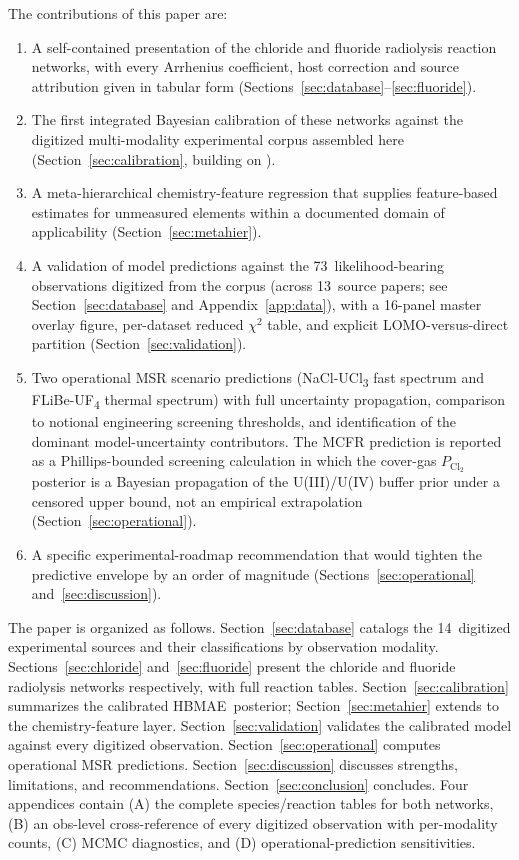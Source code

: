 \documentclass[11pt]{article}
\theoremstyle{plain}
\theoremstyle{definition}
\theoremstyle{remark}
\newcommand{\HBMAE}{HBMAE\xspace}
\begin{document}
The contributions of this paper are:

\begin{enumerate}
\item A self-contained presentation of the chloride and fluoride radiolysis
      reaction networks, with every Arrhenius coefficient, host correction
      and source attribution given in tabular form
      (Sections~\ref{sec:database}--\ref{sec:fluoride}).
\item The first integrated Bayesian calibration of these networks against
      the digitized multi-modality experimental corpus assembled here
      (Section~\ref{sec:calibration}, building on \citealp{Tanore2026PaperI}).
\item A meta-hierarchical chemistry-feature regression that supplies
      feature-based estimates for unmeasured elements within a documented
      domain of applicability (Section~\ref{sec:metahier}).
\item A validation of model predictions against the 73~likelihood-bearing
      observations digitized from the corpus (across 13~source papers; see
      Section~\ref{sec:database} and Appendix~\ref{app:data}), with a
      16-panel master overlay figure, per-dataset reduced $\chi^2$ table,
      and explicit LOMO-versus-direct partition (Section~\ref{sec:validation}).
\item Two operational MSR scenario predictions
      (NaCl-UCl\textsubscript{3} fast spectrum and FLiBe-UF\textsubscript{4}
      thermal spectrum) with full uncertainty propagation, comparison to
      notional engineering screening thresholds, and identification of the
      dominant model-uncertainty contributors.  The MCFR prediction is
      reported as a Phillips-bounded screening calculation in which the
      cover-gas $P_{\mathrm{Cl}_2}$ posterior is a Bayesian propagation of
      the U(III)/U(IV) buffer prior under a censored upper bound, not an
      empirical extrapolation (Section~\ref{sec:operational}).
\item A specific experimental-roadmap recommendation that would tighten
      the predictive envelope by an order of magnitude
      (Sections~\ref{sec:operational} and~\ref{sec:discussion}).
\end{enumerate}

The paper is organized as follows.  Section~\ref{sec:database} catalogs the
14~digitized experimental sources and their classifications by observation
modality.  Sections~\ref{sec:chloride} and~\ref{sec:fluoride} present the
chloride and fluoride radiolysis networks respectively, with full reaction
tables.  Section~\ref{sec:calibration} summarizes the calibrated \HBMAE\
posterior; Section~\ref{sec:metahier} extends to the chemistry-feature
layer.  Section~\ref{sec:validation} validates the calibrated model against
every digitized observation.  Section~\ref{sec:operational} computes
operational MSR predictions.  Section~\ref{sec:discussion} discusses
strengths, limitations, and recommendations.  Section~\ref{sec:conclusion}
concludes.  Four appendices contain (A) the complete species/reaction
tables for both networks, (B) an obs-level cross-reference of every
digitized observation with per-modality counts, (C) MCMC diagnostics, and
(D) operational-prediction sensitivities.
\end{document}
